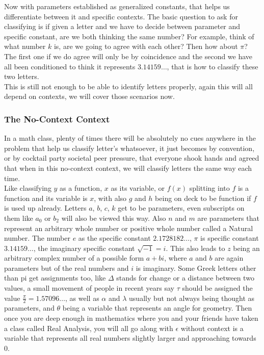 \documentclass[12pt]{article}
\begin{document}
Now with parameters established as generalized constants, that helps us differentiate between it and specific contexts. The basic question to ask for classifying is if given a letter and we have to decide between parameter and specific constant, are we both thinking the same number? For example, think of what number $k$ is, are we going to agree with each other? Then how about $\pi$? The first one if we do agree will only be by coincidence and the second we have all been conditioned to think it represents $3.14159\ldots$, that is how to classify these two letters. \\

This is still not enough to be able to identify letters properly, again this will all depend on contexts, we will cover those scenarios now.

\subsubsection{The No-Context Context}

In a math class, plenty of times there will be absolutely no cues anywhere in the problem that help us classify letter's whatsoever, it just becomes by convention, or by cocktail party societal peer pressure, that everyone shook hands and agreed that when in this no-context context, we will classify letters the same way each time. \\

Like classifying $y$ as a function, $x$ as its variable, or $f(x)$ splitting into $f$ is a function and its variable is $x$, with also $g$ and $h$ being on deck to be function if $f$ is used up already. Letters $a$, $b$, $c$, $k$ get to be parameters, even subscripts on them like $a_0$ or $b_2$ will also be viewed this way. Also $n$ and $m$ are parameters that represent an arbitrary whole number or positive whole number called a Natural number. The number $e$ as the specific constant $2.1728182\ldots$, $\pi$ is specific constant $3.14159\ldots$, the imaginary specific constant $\sqrt{-1}=i$. This also leads to $z$ being an arbitrary complex number of a possible form $a+bi$, where $a$ and $b$ are again parameters but of the real numbers and $i$ is imaginary. Some Greek letters other than pi get assignments too, like $\Delta$ stands for change or a distance between two values, a small movement of people in recent years say $\tau$ should be assigned the value $\frac{\pi}{2}=1.57096\ldots$, as well as $\alpha$ and $\lambda$ usually but not always being thought as parameters, and $\theta$ being a variable that represents an angle for geometry. Then once you are deep enough in mathematics where you and your friends have taken a class called Real Analysis, you will all go along with $\epsilon$ without context is a variable that represents all real numbers slightly larger and approaching towards $0$. \\
\end{document}
